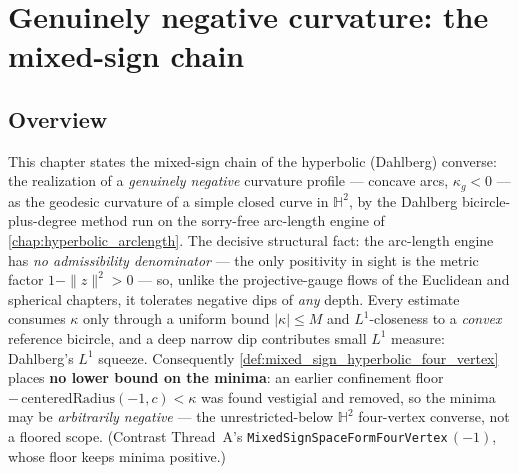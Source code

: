 \chapter{Genuinely negative curvature: the mixed-sign chain}
\label{chap:hyperbolic_mixedsign}


\section{Overview}

This chapter states the mixed-sign chain of the hyperbolic (Dahlberg) converse:
the realization of a \emph{genuinely negative} curvature profile — concave
arcs, $\kappa_g<0$ — as the geodesic curvature of a simple closed curve in
$\mathbb H^2$, by the Dahlberg bicircle-plus-degree method run on the
sorry-free arc-length engine of \cref{chap:hyperbolic_arclength}. The decisive
structural fact: the arc-length engine has \emph{no admissibility denominator}
— the only positivity in sight is the metric factor $1-\|z\|^2>0$ — so, unlike
the projective-gauge flows of the Euclidean and spherical chapters, it
tolerates negative dips of \emph{any} depth. Every estimate consumes $\kappa$
only through a uniform bound $|\kappa|\le M$ and $L^1$-closeness to a
\emph{convex} reference bicircle, and a deep narrow dip contributes small
$L^1$ measure: Dahlberg's $L^1$ squeeze. Consequently
\cref{def:mixed_sign_hyperbolic_four_vertex} places \textbf{no lower bound on
the minima}: an earlier confinement floor
$-\,\mathrm{centeredRadius}(-1,c)<\kappa$ was found vestigial and removed, so
the minima may be \emph{arbitrarily negative} — the unrestricted-below
$\mathbb H^2$ four-vertex converse, not a floored scope. (Contrast Thread~A's
\texttt{MixedSignSpaceFormFourVertex}\,$(-1)$, whose floor keeps minima
positive.)

